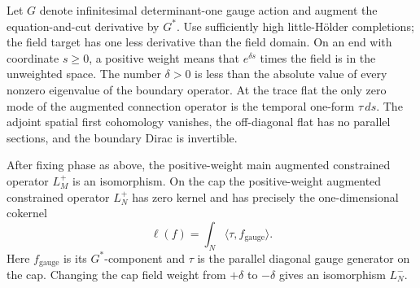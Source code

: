 Let $G$ denote infinitesimal determinant-one gauge action and augment
the equation-and-cut derivative by $G^*$.  Use sufficiently high
little-H\"older completions; the field target has one less derivative
than the field domain.  On an end with coordinate $s\geq0$, a positive
weight means that $e^{\delta s}$ times the field is in the unweighted
space.  The number $\delta>0$ is less than the absolute value of every
nonzero eigenvalue of the boundary operator.  At the trace flat the
only zero mode of the augmented connection operator is the temporal
one-form $\tau\,ds$.  The adjoint spatial first cohomology vanishes,
the off-diagonal flat has no parallel sections, and the boundary
Dirac is invertible.

\begin{lemma}
\label{lem:gluing:blocks}
After fixing phase as above, the positive-weight main augmented
constrained operator $L_M^+$ is an isomorphism.  On the cap the
positive-weight augmented constrained operator $L_N^+$ has zero
kernel and has precisely the one-dimensional cokernel
\begin{equation}
 \ell(f)=\int_N\langle\tau,f_{\mathrm{gauge}}\rangle.
 \label{eq:gluing:scalar-cokernel}
\end{equation}
Here $f_{\mathrm{gauge}}$ is its $G^*$-component and $\tau$ is the
parallel diagonal gauge generator on the cap.  Changing the cap
field weight from $+\delta$ to $-\delta$ gives an isomorphism $L_N^-$.
\end{lemma}

